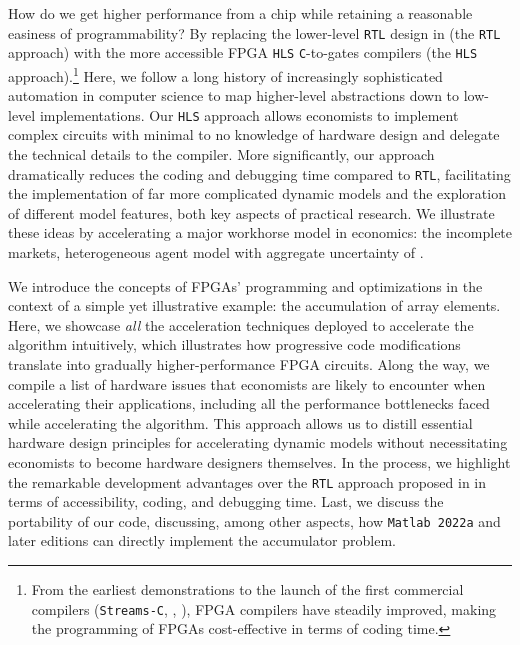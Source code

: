 \documentclass[12pt,american]{article}
\begin{document}
How do we get higher performance from a chip while retaining a reasonable easiness of programmability? By replacing the lower-level \texttt{RTL} design in \citet{Peri2020} (the \texttt{RTL} approach) with the more accessible FPGA \texttt{HLS} \texttt{C}-to-gates compilers (the \texttt{HLS} approach).\footnote{From the earliest demonstrations \citep{Babb1999} to the launch of the first commercial compilers (\texttt{Streams-C}, \citealt{Frigo2001}, \citealt{Snider2002}), FPGA compilers have steadily improved, making the programming of FPGAs cost-effective in terms of coding time.} Here, we follow a long history of increasingly sophisticated automation in computer science to map higher-level abstractions down to low-level implementations. Our \texttt{HLS} approach allows economists to implement complex circuits with minimal to no knowledge of hardware design and delegate the technical details to the compiler. More significantly, our approach dramatically reduces the coding and debugging time compared to \texttt{RTL}, facilitating the implementation of far more complicated dynamic models and the exploration of different model features, both key aspects of practical research. We illustrate these ideas by accelerating a major workhorse model in economics: the incomplete markets, heterogeneous agent model with aggregate uncertainty of \citet{KrusellSmith1998}.

We introduce the concepts of FPGAs' programming and optimizations in the context of a simple yet illustrative example: the accumulation of array elements. Here, we showcase \textit{all} the acceleration techniques deployed to accelerate the \citet{KrusellSmith1998} algorithm intuitively, which illustrates how progressive code modifications translate into gradually higher-performance FPGA circuits. Along the way, we compile a list of hardware issues that economists are likely to encounter when accelerating their applications, including all the performance bottlenecks faced while accelerating the \citet{KrusellSmith1998} algorithm. This approach allows us to distill essential hardware design principles for accelerating dynamic models without necessitating economists to become hardware designers themselves. In the process, we highlight the remarkable development advantages over the \texttt{RTL} approach proposed in \citet{Peri2020} in terms of accessibility, coding, and debugging time. Last, we discuss the portability of our code, discussing, among other aspects, how \texttt{Matlab 2022a} and later editions can directly implement the accumulator problem.
\end{document}
